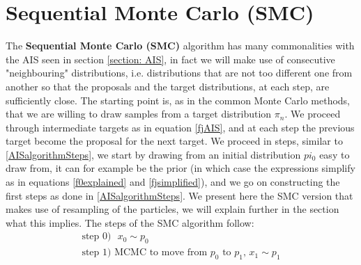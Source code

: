 \documentclass[12pt,mythesisstyle]{report}
\begin{document}
\section{Sequential Monte Carlo (SMC)}\label{section: SMC}
\begin{comment}
LEO: NELLE DISTRIBUZIONI INVECE DI P CHIAMARLE \PI
LEO: METTERE I RIFERIMENTI BIBL PER SMC
\end{comment}
The \textbf{Sequential Monte Carlo (SMC)} algorithm has many commonalities with the AIS seen in section \ref{section: AIS}, in fact we will make use of consecutive "neighbouring" distributions, i.e. distributions that are not too different one from another so that the proposals and the target distributions, at each step, are sufficiently close. The starting point is, as in the common Monte Carlo methods, that we are willing to draw samples from a target distribution $\pi_n$. We proceed through intermediate targets as in equation \eqref{fjAIS}, and at each step the previous target become the proposal for the next target. We proceed in steps, similar to \eqref{AISalgorithmSteps}, we start by drawing from an initial distribution $pi_0$ easy to draw from, it can for example be the prior (in which case the expressions simplify as in equations \eqref{f0explained} and \eqref{fjsimplified}), and we go on constructing the first steps as done in \eqref{AISalgorithmSteps}. We present here the SMC version that makes use of resampling of the particles, we will explain further in the section what this implies. The steps of the SMC algorithm follow:
\begin{equation}\label{SMCalgorithmSteps1}
\begin{aligned}
\text{step 0)}  \text{ }x_{0}\sim p_{0} \\
\text{step 1)} \text{ MCMC to move from } p_0 \text{ to } p_1\text{, }x_{1}\sim p_{1}\\
\end{aligned}
\end{equation}
\end{document}
